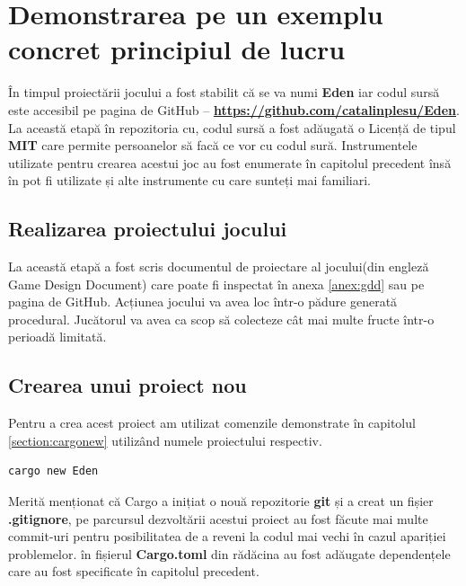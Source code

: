 \clearpage
\section{Demonstrarea pe un exemplu concret principiul de lucru}
În timpul proiectării jocului a fost stabilit că se va numi \textbf{Eden}
iar codul sursă este accesibil pe pagina de GitHub --
\textbf{\url{https://github.com/catalinplesu/Eden}}. 
La această etapă în repozitoria cu, codul sursă a fost adăugată o Licență de tipul
\textbf{MIT} care permite persoanelor să facă ce vor cu codul sură.
Instrumentele utilizate pentru crearea acestui joc au fost enumerate în
capitolul precedent însă în pot fi utilizate și alte instrumente cu care
sunteți mai familiari.

\subsection{Realizarea proiectului jocului}
La această etapă a fost scris documentul de proiectare al
jocului(din engleză Game Design Document) care poate fi inspectat în anexa
\ref{anex:gdd} sau pe pagina de GitHub. Acțiunea jocului va avea loc într-o
pădure generată procedural. Jucătorul va avea ca scop să colecteze cât mai
multe fructe într-o perioadă limitată.

\subsection{Crearea unui proiect nou}
Pentru a crea acest proiect am utilizat comenzile demonstrate în capitolul
\ref{section:cargonew} utilizând numele proiectului respectiv.
\begin{lstlisting}
cargo new Eden
\end{lstlisting}
Merită menționat că Cargo a inițiat o nouă repozitorie \textbf{git} și a creat
un fișier \textbf{.gitignore}, pe parcursul dezvoltării acestui proiect au fost
făcute mai multe commit-uri pentru posibilitatea de a reveni la codul mai vechi
în cazul apariției problemelor. în fișierul \textbf{Cargo.toml} din rădăcina au
fost adăugate dependențele care au fost specificate în capitolul precedent.

